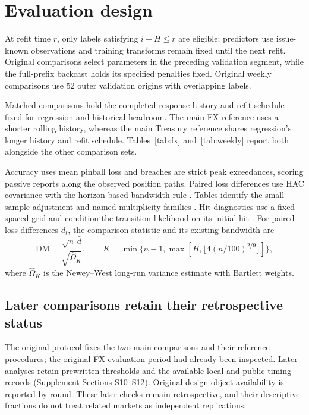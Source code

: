 \documentclass[11pt,a4paper]{article}
\begin{document}
\FloatBarrier

\section{Evaluation design}\label{sec:evaluation}

At refit time \(r\), only labels satisfying \(i+H\le r\) are eligible; predictors use issue-known observations and training transforms remain fixed until the next refit. Original comparisons select parameters in the preceding validation segment, while the full-prefix backcast holds its specified penalties fixed. Original weekly comparisons use 52 outer validation origins with overlapping labels.

Matched comparisons hold the completed-response history and refit schedule fixed for regression and historical headroom. The main FX reference uses a shorter rolling history, whereas the main Treasury reference shares regression's longer history and refit schedule. Tables~\ref{tab:fx} and~\ref{tab:weekly} report both alongside the other comparison sets.

Accuracy uses mean pinball loss and breaches are strict peak exceedances, scoring passive reports along the observed position paths. Paired loss differences use HAC covariance with the horizon-based bandwidth rule \citep{dm1995,nw1987}. Tables identify the small-sample adjustment and named multiplicity families \citep{hln1997,holm1979}. Hit diagnostics use a fixed spaced grid and condition the transition likelihood on its initial hit \citep{kupiec1995,christ1998}.
For paired loss differences \(d_t\), the comparison statistic and its existing bandwidth are
\[
\mathrm{DM}=\frac{\sqrt n\,\bar d}{\sqrt{\widehat\Omega_K}},\qquad
K=\min\{n-1,\max[H,\lfloor4(n/100)^{2/9}\rfloor]\},
\]
where \(\widehat\Omega_K\) is the Newey--West long-run variance estimate with Bartlett weights.


\subsection{Later comparisons retain their retrospective status}

The original protocol fixes the two main comparisons and their reference procedures; the original FX evaluation period had already been inspected. Later analyses retain prewritten thresholds and the available local and public timing records (Supplement Sections S10--S12). Original design-object availability is reported by round. These later checks remain retrospective, and their descriptive fractions do not treat related markets as independent replications.
\end{document}
